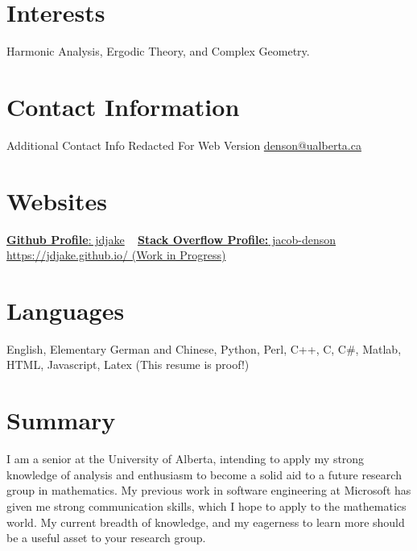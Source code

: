 \documentclass{friggeri-cv} %
\begin{document}


\begin{aside} %
\section{Interests}
Harmonic Analysis, Ergodic Theory, and Complex Geometry.
\section{Contact Information}
Additional Contact Info Redacted For Web Version
\href{mailto:denson@ualberta.ca}{denson@ualberta.ca}
\section{Websites}
\href{https://github.com/jdjake}{{\bf Github Profile}: jdjake}
~
\href{http://stackoverflow.com/users/2601483/jacob-denson}{{\bf Stack Overflow Profile:} jacob-denson}
~
\href{https://jdjake.github.io/}{https://jdjake.github.io/ (Work in Progress)}
\section{Languages}
English, Elementary German and Chinese,
Python, Perl, C++, C, C\#, Matlab, HTML, Javascript, Latex (This resume is proof!)
\end{aside}


\section{Summary}

I am a senior at the University of Alberta, intending to apply my strong knowledge of analysis and enthusiasm to become a solid aid to a future research group in mathematics. My previous work in software engineering at Microsoft has given me strong communication skills, which I hope to apply to the mathematics world. My current breadth of knowledge, and my eagerness to learn more should be a useful asset to your research group.
\end{document}
